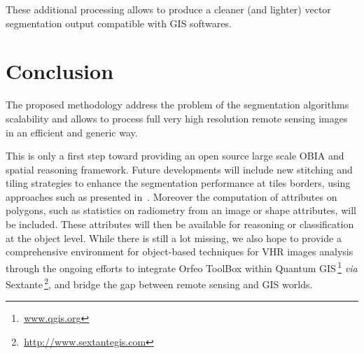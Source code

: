 \documentclass{josis}
\newcommand{\furl}[1]{$\,$\footnote{$\,$\url{#1}}}
\begin{document}
These additional processing allows to produce a cleaner (and lighter) vector
segmentation output compatible with GIS softwares.

\section{Conclusion}

The proposed methodology address the problem of the segmentation algorithms
scalability and allows to process full very high resolution remote sensing
images in an efficient and generic way.

This is only a first step toward providing an open source large scale
OBIA and spatial reasoning framework. Future developments will include
new stitching and tiling strategies to enhance the segmentation
performance at tiles borders, using approaches such as presented
in~\cite{crisp2003fast}. Moreover the computation of attributes on
polygons, such as statistics on radiometry from an image or shape
attributes, will be included. These attributes will then be available
for reasoning or classification at the object level. While there is
still a lot missing, we also hope to provide a comprehensive
environment for object-based techniques for VHR images analysis
through the ongoing efforts to integrate Orfeo ToolBox within Quantum
GIS\furl{www.qgis.org} \textit{via}
Sextante\furl{http://www.sextantegis.com}, and bridge the gap between
remote sensing and GIS worlds. 



\end{document}
